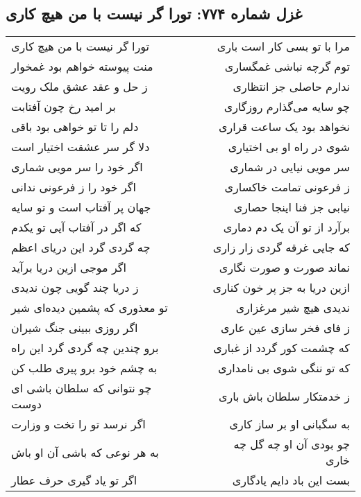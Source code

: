 \begin{center}
\section*{غزل شماره ۷۷۴: تورا گر نیست با من هیچ کاری}
\label{sec:774}
\begin{longtable}{l p{0.5cm} r}
تورا گر نیست با من هیچ کاری
&&
مرا با تو بسی کار است باری
\\
منت پیوسته خواهم بود غمخوار
&&
توم گرچه نباشی غمگساری
\\
ز حل و عقد عشق ملک رویت
&&
ندارم حاصلی جز انتظاری
\\
بر امید رخ چون آفتابت
&&
چو سایه می‌گذارم روزگاری
\\
دلم را تا تو خواهی بود باقی
&&
نخواهد بود یک ساعت قراری
\\
دلا گر سر عشقت اختیار است
&&
شوی در راه او بی اختیاری
\\
اگر خود را سر مویی شماری
&&
سر مویی نیایی در شماری
\\
اگر خود را ز فرعونی ندانی
&&
ز فرعونی تمامت خاکساری
\\
جهان پر آفتاب است و تو سایه
&&
نیابی جز فنا اینجا حصاری
\\
که اگر در آفتاب آیی تو یکدم
&&
برآرد از تو آن یک دم دماری
\\
چه گردی گرد این دریای اعظم
&&
که جایی غرقه گردی زار زاری
\\
اگر موجی ازین دریا برآید
&&
نماند صورت و صورت نگاری
\\
ز دریا چند گویی چون ندیدی
&&
ازین دریا به جز پر خون کناری
\\
تو معذوری که پشمین دیده‌ای شیر
&&
ندیدی هیچ شیر مرغزاری
\\
اگر روزی ببینی جنگ شیران
&&
ز فای فخر سازی عین عاری
\\
برو چندین چه گردی گرد این راه
&&
که چشمت کور گردد از غباری
\\
به چشم خود برو پیری طلب کن
&&
که تو ننگی شوی بی نامداری
\\
چو نتوانی که سلطان باشی ای دوست
&&
ز خدمتکار سلطان باش باری
\\
اگر نرسد تو را تخت و وزارت
&&
به سگبانی او بر ساز کاری
\\
به هر نوعی که باشی آن او باش
&&
چو بودی آن او چه گل چه خاری
\\
اگر تو یاد گیری حرف عطار
&&
بست این باد دایم یادگاری
\\
\end{longtable}
\end{center}

